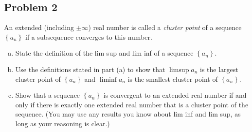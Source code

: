 \documentclass[12pt]{article}
\newcommand{\ita}[1]{\textit{#1}}
\newcommand\setb[1]{\left \{ #1 \right \}}
\theoremstyle{definition}
\begin{document}
\subsection{Problem 2 \texorpdfstring{ \cite{PZ} }{}}
An extended (including $\pm \infty$) real number is called a \ita{cluster point} of a sequence $\setb{ a_n }$ if a subsequence converges to this number. 
\begin{enumerate}[(a)]
    \item State the definition of the lim sup and lim inf of a sequence $\setb{ a_n }$. 
    \item Use the definitions stated in part (a) to show that $\limsup a_n$ is the largest cluster point of $\setb{ a_n }$ and $\liminf a_n$ is the smallest cluster point of $\setb{ a_n }$.
    \item Show that a sequence $\setb{ a_n }$ is convergent to an extended real number if and only if there is exactly one extended real number that is a cluster point of the sequence. (You may use any results you know about lim inf and lim sup, as long as your reasoning is clear.)
\end{enumerate}
\end{document}
